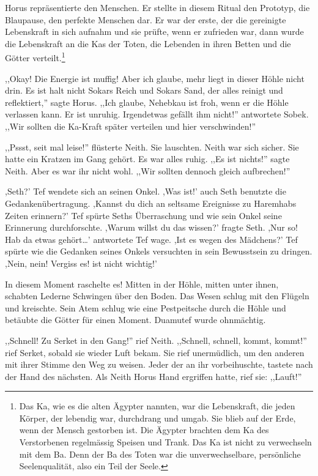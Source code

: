 \documentclass[11pt,titlepage,a5paper]{book}
\begin{document}
Horus repräsentierte den Menschen. Er stellte in diesem Ritual den Prototyp, die Blaupause, den perfekte Menschen dar. Er war der erste, der die gereinigte Lebenskraft in sich aufnahm und sie prüfte, wenn er zufrieden war, dann wurde die Lebenskraft an die Kas der Toten, die Lebenden in ihren Betten und die Götter verteilt.\footnote{Das Ka, wie es die alten Ägypter nannten, war die Lebenskraft, die jeden Körper, der lebendig war, durchdrang und umgab. Sie blieb auf der Erde, wenn der Mensch gestorben ist. Die Ägypter brachten dem Ka des Verstorbenen regelmässig Speisen und Trank. Das Ka ist nicht zu verwechseln mit dem Ba. Denn der Ba des Toten war die unverwechselbare, persönliche Seelenqualität, also ein Teil der Seele.}


,,Okay! Die Energie ist muffig! Aber ich glaube, mehr liegt in dieser Höhle nicht drin. Es ist halt nicht Sokars Reich und Sokars Sand, der alles reinigt und reflektiert,''  sagte Horus. ,,Ich glaube, Nehebkau ist froh, wenn er die Höhle verlassen kann. Er ist unruhig. Irgendetwas gefällt ihm nicht!'' antwortete Sobek. ,,Wir sollten die Ka-Kraft später verteilen und hier verschwinden!''

,,Pssst, seit mal leise!'' flüsterte Neith. Sie lauschten. Neith war sich sicher. Sie hatte ein Kratzen im Gang gehört. Es war alles ruhig. ,,Es ist nichts!'' sagte Neith. Aber es war ihr nicht wohl. ,,Wir sollten dennoch gleich aufbrechen!''  

,Seth?' Tef wendete sich an seinen Onkel. ,Was ist!' auch Seth benutzte die Gedankenübertragung. ,Kannst du dich an seltsame Ereignisse zu Haremhabs Zeiten erinnern?' Tef spürte Seths Überraschung und wie sein Onkel seine Erinnerung durchforschte. ,Warum willst du das wissen?' fragte Seth. ,Nur so! Hab da etwas gehört\dots' antwortete Tef wage. ,Ist es wegen des Mädchens?' Tef spürte wie die Gedanken seines Onkels versuchten in sein Bewusstsein zu dringen. ,Nein, nein! Vergiss es! ist nicht wichtig!'

In diesem Moment raschelte es! Mitten in der Höhle, mitten unter ihnen, schabten Lederne Schwingen über den Boden. Das Wesen schlug mit den Flügeln und kreischte. Sein Atem schlug wie eine Pestpeitsche durch die Höhle und betäubte die Götter für einen Moment. Duamutef wurde ohnmächtig.

,,Schnell! Zu Serket in den Gang!'' rief Neith. ,,Schnell, schnell, kommt, kommt!'' rief Serket, sobald sie wieder Luft bekam. Sie rief unermüdlich, um den anderen mit ihrer Stimme den Weg zu weisen. Jeder der an ihr vorbeihuschte, tastete nach der Hand des nächsten. Als Neith Horus Hand ergriffen hatte, rief sie: ,,Lauft!''
\end{document}
